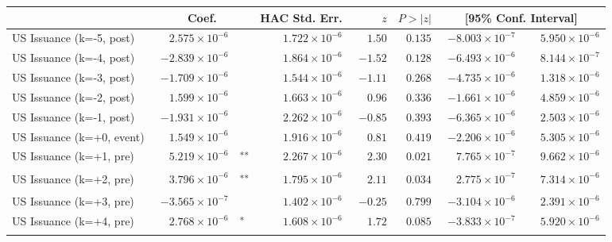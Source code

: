 \documentclass[10pt]{article}
\begin{document}
\noindent\begin{tabular}{@{}l|r@{}l rrr rr@{}}
\hline
 & \multicolumn{2}{c}{Coef.} & HAC Std. Err. & $z$ & $P>|z|$ & \multicolumn{2}{c}{[95\% Conf. Interval]} \\
\hline
US Issuance (k=-5, post) & $\phantom{-}2.575\!\times\!10^{-6}$ & \textsuperscript{} & $\phantom{-}1.722\!\times\!10^{-6}$ & $\phantom{-}1.50$ & $0.135$ & $-8.003\!\times\!10^{-7}$ & $\phantom{-}5.950\!\times\!10^{-6}$ \\
US Issuance (k=-4, post) & $-2.839\!\times\!10^{-6}$ & \textsuperscript{} & $\phantom{-}1.864\!\times\!10^{-6}$ & $-1.52$ & $0.128$ & $-6.493\!\times\!10^{-6}$ & $\phantom{-}8.144\!\times\!10^{-7}$ \\
US Issuance (k=-3, post) & $-1.709\!\times\!10^{-6}$ & \textsuperscript{} & $\phantom{-}1.544\!\times\!10^{-6}$ & $-1.11$ & $0.268$ & $-4.735\!\times\!10^{-6}$ & $\phantom{-}1.318\!\times\!10^{-6}$ \\
US Issuance (k=-2, post) & $\phantom{-}1.599\!\times\!10^{-6}$ & \textsuperscript{} & $\phantom{-}1.663\!\times\!10^{-6}$ & $\phantom{-}0.96$ & $0.336$ & $-1.661\!\times\!10^{-6}$ & $\phantom{-}4.859\!\times\!10^{-6}$ \\
US Issuance (k=-1, post) & $-1.931\!\times\!10^{-6}$ & \textsuperscript{} & $\phantom{-}2.262\!\times\!10^{-6}$ & $-0.85$ & $0.393$ & $-6.365\!\times\!10^{-6}$ & $\phantom{-}2.503\!\times\!10^{-6}$ \\
US Issuance (k=+0, event) & $\phantom{-}1.549\!\times\!10^{-6}$ & \textsuperscript{} & $\phantom{-}1.916\!\times\!10^{-6}$ & $\phantom{-}0.81$ & $0.419$ & $-2.206\!\times\!10^{-6}$ & $\phantom{-}5.305\!\times\!10^{-6}$ \\
US Issuance (k=+1, pre) & $\phantom{-}5.219\!\times\!10^{-6}$ & \textsuperscript{**} & $\phantom{-}2.267\!\times\!10^{-6}$ & $\phantom{-}2.30$ & $0.021$ & $\phantom{-}7.765\!\times\!10^{-7}$ & $\phantom{-}9.662\!\times\!10^{-6}$ \\
US Issuance (k=+2, pre) & $\phantom{-}3.796\!\times\!10^{-6}$ & \textsuperscript{**} & $\phantom{-}1.795\!\times\!10^{-6}$ & $\phantom{-}2.11$ & $0.034$ & $\phantom{-}2.775\!\times\!10^{-7}$ & $\phantom{-}7.314\!\times\!10^{-6}$ \\
US Issuance (k=+3, pre) & $-3.565\!\times\!10^{-7}$ & \textsuperscript{} & $\phantom{-}1.402\!\times\!10^{-6}$ & $-0.25$ & $0.799$ & $-3.104\!\times\!10^{-6}$ & $\phantom{-}2.391\!\times\!10^{-6}$ \\
US Issuance (k=+4, pre) & $\phantom{-}2.768\!\times\!10^{-6}$ & \textsuperscript{*} & $\phantom{-}1.608\!\times\!10^{-6}$ & $\phantom{-}1.72$ & $0.085$ & $-3.833\!\times\!10^{-7}$ & $\phantom{-}5.920\!\times\!10^{-6}$ \\

\end{tabular}
\end{document}

